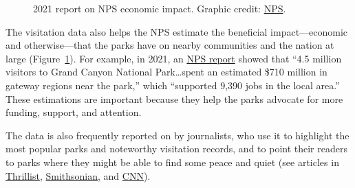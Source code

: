 \documentclass[
  letterpaper,
  DIV=11,
  numbers=noendperiod]{scrartcl}
\begin{document}
\begin{figure}


\caption{\label{fig-economic-benefit}2021 report on NPS economic impact.
Graphic credit: \href{https://www.nps.gov/orgs/1207/vse2020.htm}{NPS}.}

\end{figure}%

The visitation data also helps the NPS estimate the beneficial
impact---economic and otherwise---that the parks have on nearby
communities and the nation at large (Figure~\ref{fig-economic-benefit}).
For example, in 2021, an
\href{https://www.nps.gov/grca/learn/news/visitor-use-spending-to-grand-canyon-2021.htm}{NPS
report} showed that ``4.5 million visitors to Grand Canyon National
Park\ldots spent an estimated \$710 million in gateway regions near the
park,'' which ``supported 9,390 jobs in the local area.'' These
estimations are important because they help the parks advocate for more
funding, support, and attention.

The data is also frequently reported on by journalists, who use it to
highlight the most popular parks and noteworthy visitation records, and
to point their readers to parks where they might be able to find some
peace and quiet (see articles in
\href{https://www.thrillist.com/news/nation/most-visited-national-parks-ranked-nps}{Thrillist},
\href{https://www.smithsonianmag.com/smart-news/most-and-least-popular-national-parks-2023-180983850/}{Smithsonian},
and
\href{https://www.cnn.com/travel/article/most-visited-us-national-park-sites-2022/index.html}{CNN}).
\end{document}
